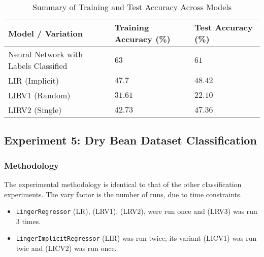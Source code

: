 \documentclass[a4paper, 12pt]{report}
\begin{document}
\begin{table}[H]
    \centering
    \caption{Summary of Training and Test Accuracy Across Models}
    \label{tab:summary_accuracy_all_models_accuracy_exp4}
    \small
    \begin{tabular}{|l|l|l|}
    \toprule
    \textbf{Model / Variation} & \textbf{Training Accuracy (\%)} & \textbf{Test Accuracy (\%)} \\
    \midrule
    Neural Network with Labels Classified & $63$ & $61$ \\
    LIR (Implicit) & $47.7$ & $48.42$ \\
    LIRV1 (Random) & $31.61$ & $22.10$ \\
    LIRV2 (Single) & $42.73$ & $47.36$ \\
    \bottomrule
    \end{tabular}
\end{table}
\clearpage

\subsection{Experiment 5: Dry Bean Dataset Classification}
\subsubsection{Methodology}
The experimental methodology is identical to that of the other classification experiments.
The vary factor is the number of runs, due to time constraints.
\begin{itemize}
    \item \texttt{LingerRegressor} (LR),  (LRV1), (LRV2), were run once and (LRV3) was run 3 times.
    \item \texttt{LingerImplicitRegressor} (LIR) was run twice, its variant (LICV1) was run twic and (LICV2) was run once.
\end{itemize}
\end{document}
